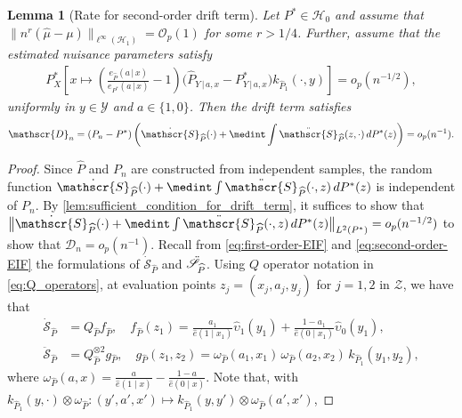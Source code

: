 \documentclass{article}
\theoremstyle{plain}
\newtheorem{lemma}[theorem]{Lemma}
\theoremstyle{definition}
\theoremstyle{remark}
\newcommand{\of}[1]{\left(#1\right)}
\newcommand{\off}[1]{\left[#1\right]}
\newcommand{\cH}{\mathcal{H}}
\newcommand{\cZ}{\mathcal{Z}}
\newcommand{\cO}{\mathcal{O}}
\newcommand{\cY}{\mathcal{Y}}
\newcommand{\ucH}{\mathscr{H}}
\newcommand{\ucD}{\mathscr{D}}
\newcommand{\wh}[1]{\widehat{#1}}
\newcommand{\hP}{\widehat{P}}
\newcommand{\1}{\mathbbm{1}}
\newcommand{\STE}{\mathscr{S}}
\theoremstyle{plain}
\theoremstyle{definition}
\newcommand{\mymid}{\,|\,}
\begin{document}
\begin{lemma}[Rate for second-order drift term]\label{lem:drift_term}
    Let $P^* \in \ucH_0$ and assume that $\|n^r(\hat{\mu} - \mu)\|_{\ell^\infty(\cH_1)} = \cO_p(1)$ for some $r > 1/4$. Further, assume that the estimated nuisance parameters satisfy 
    \begin{align*}
        P^*_{X}\off{x \mapsto \of{\frac{e_{\hP}(a \mymid x)}{e_{P^*}(a \mymid x)}-1}\big({\hP_{Y \mymid a, x} - P^*_{Y \mymid a, x}}\big) k_{\hP_1}(\cdot, y)} = o_p(n^{-1/2}),
    \end{align*}
    uniformly in $y \in \cY$ and $a \in \{1,0\}$. Then the drift term satisfies
    \[
    \ucD_n = (P_n - P^*) \of{\dot{\STE}_{\hP}(\cdot) + \medint\int \ddot{\STE}_{\hP}(z, \cdot) \, dP^*(z)} = o_p(n^{-1}).
    \]
\end{lemma}
\begin{proof}
    Since $\hP$ and $P_n$ are constructed from independent samples, the random function $ \dot{\STE}_{\hP}(\cdot) + \medint\int \ddot{\STE}_{\hP}(\cdot, z) \, dP^*(z)$ is independent of $P_n$. By \cref{lem:sufficient_condition_for_drift_term}, it suffices to show that $\big\|{\dot{\STE}_{\hP}(\cdot) + \medint\int \ddot{\STE}_{\hP}(\cdot, z) \, dP^*(z)}\big\|_{L^2(P^*)} = o_p(n^{-1/2})$ to show that $\ucD_n = o_p(n^{-1})$. 
   Recall from \eqref{eq:first-order-EIF} and \eqref{eq:second-order-EIF} the formulations of $\dot{\STE}_{\hP}$ and $\Ddot{\STE}_{\hP}$. Using $Q$ operator notation in \eqref{eq:Q_operators}, at evaluation points $z_j = (x_j,a_j,y_j) $ for $j = 1,2$ in $\cZ$, we have that 
   \begin{align*}
       \dot{\STE}_{\hP} &= Q_{\hP} f_{\hP}, \quad f_{\hP}(z_1) = \frac{a_1}{\hat{e}(1 \mid x_1)} \wh{\upsilon}_1(y_1) + \frac{1-a_1}{\hat{e}(0 \mid x_1)} \wh{\upsilon}_0(y_1), \\
       \ddot{\STE}_{\hP} &= Q_{\hP}^{\otimes 2} g_{\hP}, \quad g_{\hP}(z_1, z_2) = \omega_{\hP}(a_1, x_1) \, \omega_{\hP}(a_2, x_2) \, k_{\hP_1}(y_1, y_2), 
   \end{align*}
   where $\omega_{\hP}(a, x) = \tfrac{a}{\hat{e}(1 \mid x)} - \tfrac{1-a}{\hat{e}(0 \mid x)}$.
   Note that, with $k_{\hP_1} (y, \cdot) \otimes \omega_{\hP} : (y',a',x')\mapsto k_{\hP_1} (y, y') \otimes \omega_{\hP}(a',x')$,


\end{proof}
\end{document}
